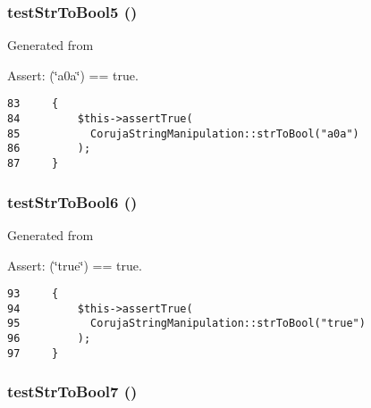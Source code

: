 \hypertarget{class_coruja_string_manipulation_test_a23a98078ee7b539a76def263a56e32b}{
\subsubsection[{testStrToBool5}]{\setlength{\rightskip}{0pt plus 5cm}testStrToBool5 ()}}
\label{class_coruja_string_manipulation_test_a23a98078ee7b539a76def263a56e32b}


Generated from \begin{Desc}
\item[Assert:](\char`\"{}a0a\char`\"{}) == true. \end{Desc}


\begin{Code}\begin{verbatim}83     {
84         $this->assertTrue(
85           CorujaStringManipulation::strToBool("a0a")
86         );
87     }
\end{verbatim}
\end{Code}


\hypertarget{class_coruja_string_manipulation_test_69c87bb16246b88a4ada9edd20b358b3}{
\subsubsection[{testStrToBool6}]{\setlength{\rightskip}{0pt plus 5cm}testStrToBool6 ()}}
\label{class_coruja_string_manipulation_test_69c87bb16246b88a4ada9edd20b358b3}


Generated from \begin{Desc}
\item[Assert:](\char`\"{}true\char`\"{}) == true. \end{Desc}


\begin{Code}\begin{verbatim}93     {
94         $this->assertTrue(
95           CorujaStringManipulation::strToBool("true")
96         );
97     }
\end{verbatim}
\end{Code}


\hypertarget{class_coruja_string_manipulation_test_7f4c2f5020265f3cc1ea93c246093e39}{
\subsubsection[{testStrToBool7}]{\setlength{\rightskip}{0pt plus 5cm}testStrToBool7 ()}}
\label{class_coruja_string_manipulation_test_7f4c2f5020265f3cc1ea93c246093e39}


